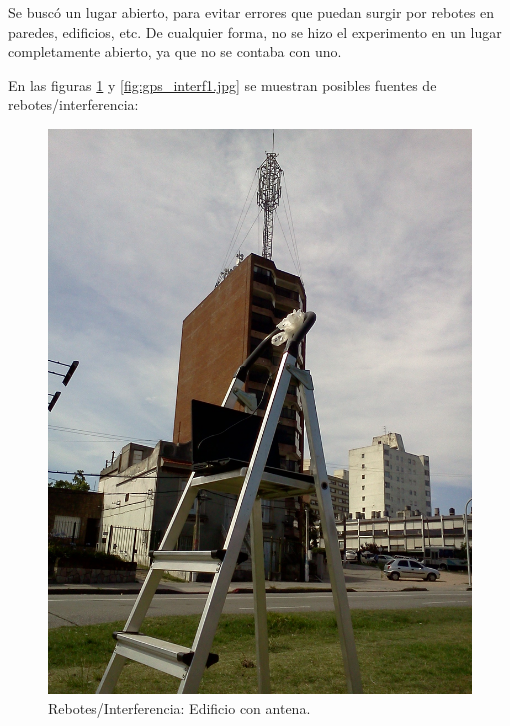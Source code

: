 \documentclass[spanish,12pt,a4paper,titlepage]{report}
\begin{document}
Se buscó un lugar abierto, para evitar errores que puedan surgir por rebotes en paredes, edificios, etc. De cualquier forma, no se hizo el experimento en un lugar completamente abierto, ya que no se contaba con uno.

En las figuras \ref{fig:gps_interf.jpg} y \ref{fig:gps_interf1.jpg} se muestran posibles fuentes de rebotes/interferencia:

\begin{figure}[h!]
  \begin{center}
  \includegraphics[width=.9\textwidth]{./img/gps_interf.jpg}
  \end{center}
  \caption{Rebotes/Interferencia: Edificio con antena.}
  \label{fig:gps_interf.jpg}
\end{figure}
\end{document}
